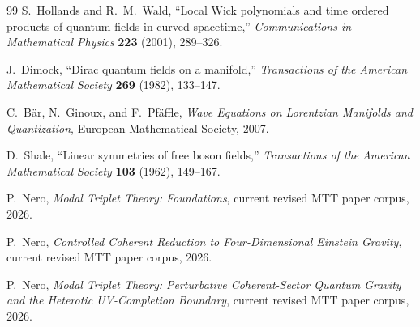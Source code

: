 \documentclass[11pt]{article}
\theoremstyle{definition}
\theoremstyle{remark}
\begin{document}
\begin{thebibliography}{99}
S.~Hollands and R.~M.~Wald,
``Local Wick polynomials and time ordered products of quantum fields in
curved spacetime,''
\emph{Communications in Mathematical Physics} \textbf{223} (2001),
289--326.

J.~Dimock,
``Dirac quantum fields on a manifold,''
\emph{Transactions of the American Mathematical Society} \textbf{269}
(1982), 133--147.

C.~B\"ar, N.~Ginoux, and F.~Pf\"affle,
\emph{Wave Equations on Lorentzian Manifolds and Quantization},
European Mathematical Society, 2007.

D.~Shale,
``Linear symmetries of free boson fields,''
\emph{Transactions of the American Mathematical Society} \textbf{103}
(1962), 149--167.

P.~Nero,
\emph{Modal Triplet Theory: Foundations},
current revised MTT paper corpus, 2026.

P.~Nero,
\emph{Controlled Coherent Reduction to Four-Dimensional Einstein Gravity},
current revised MTT paper corpus, 2026.

P.~Nero,
\emph{Modal Triplet Theory: Perturbative Coherent-Sector Quantum Gravity
and the Heterotic UV-Completion Boundary},
current revised MTT paper corpus, 2026.

\end{thebibliography}
\end{document}

